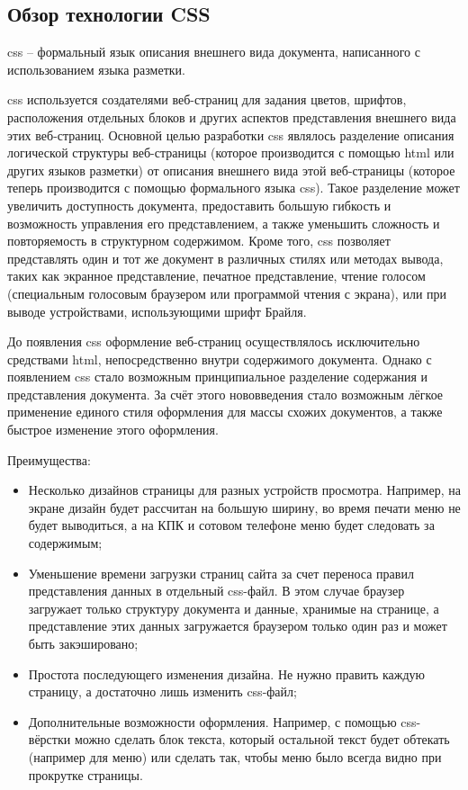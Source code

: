 \subsection{Обзор технологии CSS}

\gls{css} -- формальный язык описания внешнего вида документа, написанного с использованием языка разметки.

\gls{css} используется создателями веб-страниц для задания цветов, шрифтов, расположения отдельных блоков и других аспектов представления внешнего вида этих веб-страниц. Основной целью разработки \gls{css} являлось разделение описания логической структуры веб-страницы (которое производится с помощью \gls{html} или других языков разметки) от описания внешнего вида этой веб-страницы (которое теперь производится с помощью формального языка \gls{css}). Такое разделение может увеличить доступность документа, предоставить большую гибкость и возможность управления его представлением, а также уменьшить сложность и повторяемость в структурном содержимом. Кроме того, \gls{css} позволяет представлять один и тот же документ в различных стилях или методах вывода, таких как экранное представление, печатное представление, чтение голосом (специальным голосовым браузером или программой чтения с экрана), или при выводе устройствами, использующими шрифт Брайля.

До появления \gls{css} оформление веб-страниц осуществлялось исключительно средствами \gls{html}, непосредственно внутри содержимого документа. Однако с появлением \gls{css} стало возможным принципиальное разделение содержания и представления документа. За счёт этого нововведения стало возможным лёгкое применение единого стиля оформления для массы схожих документов, а также быстрое изменение этого оформления.

Преимущества:
\begin{itemize}
	\item Несколько дизайнов страницы для разных устройств просмотра. Например, на экране дизайн будет рассчитан на большую ширину, во время печати меню не будет выводиться, а на КПК и сотовом телефоне меню будет следовать за содержимым;
	\item Уменьшение времени загрузки страниц сайта за счет переноса правил представления данных в отдельный \gls{css}-файл. В этом случае браузер загружает только структуру документа и данные, хранимые на странице, а представление этих данных загружается браузером только один раз и может быть закэшировано;
	\item Простота последующего изменения дизайна. Не нужно править каждую страницу, а достаточно лишь изменить \gls{css}-файл;
	\item Дополнительные возможности оформления. Например, с помощью \gls{css}-вёрстки можно сделать блок текста, который остальной текст будет обтекать (например для меню) или сделать так, чтобы меню было всегда видно при прокрутке страницы.
\end{itemize}

